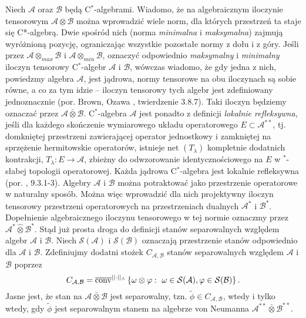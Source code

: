 Niech  $\mathcal{A}$ oraz $\mathcal{B}$ będą C$^{*}$-algebrami.
Wiadomo, że na algebraicznym iloczynie tensorowym
$\mathcal{A} \otimes \mathcal{B}$ można wprowadzić wiele norm,
dla których przestrzeń ta staje się C*-algebrą.
Dwie spośród nich (norma \emph{minimalna} i \emph{maksymalna})
zajmują wyróżnioną pozycję, ograniczając wszystkie pozostałe normy z dołu i z góry.
Jeśli przez $\mathcal{A} \otimes_{max} \mathcal{B}$
i $\mathcal{A} \otimes_{min} \mathcal{B}$,
oznaczyć odpowiednio
\emph{maksymalny} i \emph{minimalny}
iloczyn tensorowy C$^{*}$-algebr $\mathcal{A}$ i $\mathcal{B}$,
wówczas wiadomo, że gdy jedna z nich, powiedzmy algebra $\mathcal{A}$,
jest jądrowa, normy tensorowe na obu iloczynach są sobie równe,
a co za tym idzie -- iloczyn tensorowy tych algebr jest zdefiniowany
jednoznacznie (por. Brown, Ozawa \cite{Brown2008}, twierdzenie 3.8.7).
Taki iloczyn będziemy oznaczać przez
$\mathcal{A} \bar{\otimes} \mathcal{B}$.
C$^{*}$-algebra $\mathcal{A}$ jest ponadto z definicji \emph{lokalnie refleksywna},
jeśli dla każdego skończenie wymiarowego układu operatorowego
$E \subset \mathcal{A}^{**}$,
tj. domkniętej przestrzeni zawierającej operator jednostkowy i zamkniętej
na sprzężenie hermitowskie operatorów,
istnieje net $(T_{\lambda})$ kompletnie dodatnich kontrakcji,
$T_{\lambda}: E \rightarrow \mathcal{A}$,
zbieżny do odwzorowanie identycznościowego na $E$
w $^{*}$-słabej topologii operatorowej.
Każda jądrowa C$^{*}$-algebra jest lokalnie refleksywna
(por. \cite{Brown2008}, 9.3.1-3).
Algebry $\mathcal{A}$ i $\mathcal{B}$
można potraktować jako przestrzenie operatorowe w naturalny sposób.
Można więc wprowadzić dla nich projektywny iloczyn tensorowy
przestrzeni operatorowych na przestrzeniach dualnych
$\mathcal{A}^{*}$ i $\mathcal{B}^{*}$.
Dopełnienie algebraicznego iloczynu tensorowego w tej normie oznaczmy przez
$\mathcal{A}^{*} \hat{\otimes} \mathcal{B}^{*}$.
Stąd już prosta droga do definicji stanów separowalnych względem
algebr $\mathcal{A}$ i  $\mathcal{B}$.
Niech
$\mathcal{S}(\mathcal{A})$ i $\mathcal{S}(\mathcal{B})$
oznaczają przestrzenie stanów odpowiednio dla $\mathcal{A}$ i $\mathcal{B}$.
Zdefiniujmy dodatni stożek $C_{\mathcal{A},\mathcal{B}}$
stanów separowalnych względem  $\mathcal{A}$ i $\mathcal{B}$ poprzez
\begin{equation}
C_{\mathcal{A},\mathcal{B}} =
\overline{{\rm conv}}^{||\cdot||_{\wedge}}
\left \{\omega \otimes \varphi: \, \,\omega \in \mathcal{S}(\mathcal{A}),
\varphi \in \mathcal{S}(\mathcal{B})\right \}.
\end{equation}
Jasne jest, że stan na $\mathcal{A} \bar{\otimes} \mathcal{B}$ jest separowalny,
tzn. $\tilde{\phi} \in C_{\mathcal{A}, \mathcal{B}}$,
wtedy i tylko wtedy, gdy $\tilde{\phi}$ jest separowalnym stanem na
algebrze von Neumanna $\mathcal{A}^{**} \bar{\otimes} \mathcal{B}^{**}$.

